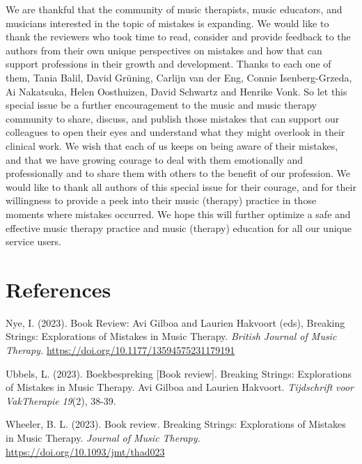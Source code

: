 \documentclass[authordate, empirical, issue]{jote-new-article}
\begin{document}
We are thankful that the community of music therapists, music educators, and musicians interested in the topic of mistakes is expanding. We would like to thank the reviewers who took time to read, consider and provide feedback to the authors from their own unique perspectives on mistakes and how that can support professions in their growth and development. Thanks to each one of them, Tania Balil, David Grüning, Carlijn van der Eng, Connie Isenberg-Grzeda, Ai Nakatsuka, Helen Oosthuizen, David Schwartz and Henrike Vonk. So let this special issue be a further encouragement to the music and music therapy community to share, discuss, and publish those mistakes that can support our colleagues to open their eyes and understand what they might overlook in their clinical work. We wish that each of us keeps on being aware of their mistakes, and that we have growing courage to deal with them emotionally and professionally and to share them with others to the benefit of our profession. We would like to thank all authors of this special issue for their courage, and for their willingness to provide a peek into their music (therapy) practice in those moments where mistakes occurred. We hope this will further optimize a safe and effective music therapy practice and music (therapy) education for all our unique service users.








\newpage
\section{References}



\hspace*{\parindent}Nye, I. (2023). Book Review: Avi Gilboa and Laurien Hakvoort (eds), Breaking Strings: Explorations of Mistakes in Music Therapy. \emph{British Journal of Music Therapy. }\url{https://doi.org/10.1177/13594575231179191}



Ubbels, L. (2023). Boekbespreking [Book review]. Breaking Strings: Explorations of Mistakes in Music Therapy. Avi Gilboa and Laurien Hakvoort. \emph{Tijdschrift}\emph{ }\emph{voor}\emph{ }\emph{VakTherapie}\emph{ 19}(2), 38-39.



Wheeler, B. L. (2023). Book review. Breaking Strings: Explorations of Mistakes in Music Therapy. \emph{Journal of Music Therapy. }\url{https://doi.org/10.1093/jmt/thad023}
\end{document}
